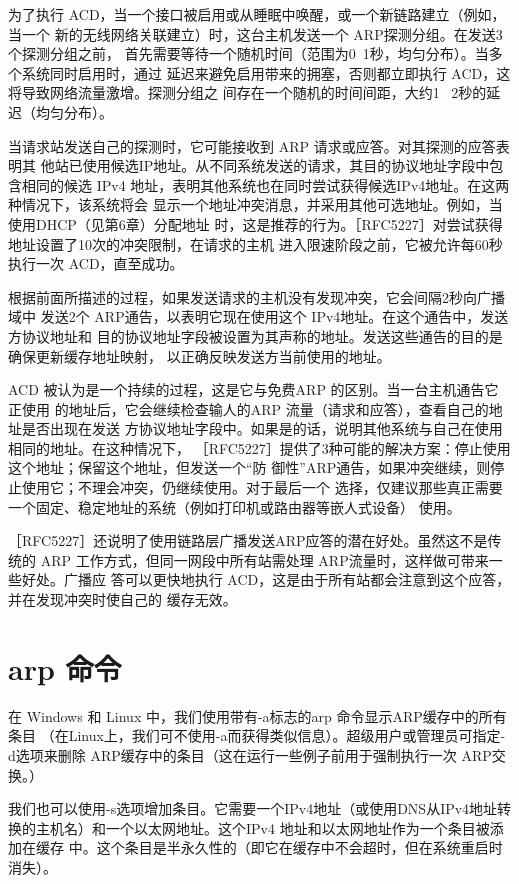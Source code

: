 为了执行 ACD，当一个接口被启用或从睡眠中唤醒，或一个新链路建立（例如，当一个
新的无线网络关联建立）时，这台主机发送一个 ARP探测分组。在发送3个探测分组之前，
首先需要等待一个随机时间（范围为0~1秒，均匀分布）。当多个系统同时启用时，通过
延迟来避免启用带来的拥塞，否则都立即执行 ACD，这将导致网络流量激增。探测分组之
间存在一个随机的时间间距，大约1 ~2秒的延迟（均匀分布）。

当请求站发送自己的探测时，它可能接收到 ARP 请求或应答。对其探测的应答表明其
他站已使用候选IP地址。从不同系统发送的请求，其目的协议地址字段中包含相同的候选
IPv4 地址，表明其他系统也在同时尝试获得候选IPv4地址。在这两种情况下，该系统将会
显示一个地址冲突消息，并采用其他可选地址。例如，当使用DHCP（见第6章）分配地址
时，这是推荐的行为。［RFC5227］对尝试获得地址设置了10次的冲突限制，在请求的主机
进入限速阶段之前，它被允许每60秒执行一次 ACD，直至成功。

根据前面所描述的过程，如果发送请求的主机没有发现冲突，它会间隔2秒向广播域中
发送2个 ARP通告，以表明它现在使用这个 IPv4地址。在这个通告中，发送方协议地址和
目的协议地址字段被设置为其声称的地址。发送这些通告的目的是确保更新缓存地址映射，
以正确反映发送方当前使用的地址。

ACD 被认为是一个持续的过程，这是它与免费ARP 的区别。当一台主机通告它正使用
的地址后，它会继续检查输人的ARP 流量（请求和应答），查看自己的地址是否出现在发送
方协议地址字段中。如果是的话，说明其他系统与自己在使用相同的地址。在这种情况下，
［RFC5227］提供了3种可能的解决方案：停止使用这个地址；保留这个地址，但发送一个“防
御性”ARP通告，如果冲突继续，则停止使用它；不理会冲突，仍继续使用。对于最后一个
选择，仅建议那些真正需要一个固定、稳定地址的系统（例如打印机或路由器等嵌人式设备）
使用。

［RFC5227］还说明了使用链路层广播发送ARP应答的潜在好处。虽然这不是传统的
ARP 工作方式，但同一网段中所有站需处理 ARP流量时，这样做可带来一些好处。广播应
答可以更快地执行 ACD，这是由于所有站都会注意到这个应答，并在发现冲突时使自己的
缓存无效。

\section{arp 命令}

在 Windows 和 Linux 中，我们使用带有-a标志的arp 命令显示ARP缓存中的所有条目
（在Linux上，我们可不使用-a而获得类似信息）。超级用户或管理员可指定-d选项来删除
ARP缓存中的条目（这在运行一些例子前用于强制执行一次 ARP交换。）

我们也可以使用-s选项增加条目。它需要一个IPv4地址（或使用DNS从IPv4地址转
换的主机名）和一个以太网地址。这个IPv4 地址和以太网地址作为一个条目被添加在缓存
中。这个条目是半永久性的（即它在缓存中不会超时，但在系统重启时消失）。

